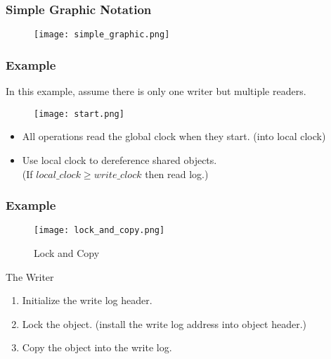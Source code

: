 \documentclass{beamer}
\begin{document}

\begin{frame}[t]
  \frametitle{Simple Graphic Notation}

  \begin{figure}[ht]
    \centering
    \texttt{[image: simple\_graphic.png]}
  \end{figure}
  
\end{frame}


\begin{frame}[t]
  \frametitle{Example}
  In this example, assume there is only one writer but multiple readers.
  \begin{figure}[ht]
    \centering
    \texttt{[image: start.png]}
  \end{figure}

  \begin{itemize}
  \item All operations read the global clock when they start. (into local clock)
  \item Use local clock to dereference shared objects.\\
    (If $local\_clock \ge write\_clock$ then read log.) 

  \end{itemize}
  
\end{frame}



\begin{frame}[t]
  \frametitle{Example}

  \begin{figure}[ht]
    \centering
    \texttt{[image: lock\_and\_copy.png]}
    \caption{Lock and Copy}
  \end{figure}

  The Writer
  \begin{enumerate}
  \item Initialize the write log header.
  \item Lock the object. (install the write log address into object header.)
  \item Copy the object into the write log.
  \end{enumerate}
  
\end{frame}
\end{document}
